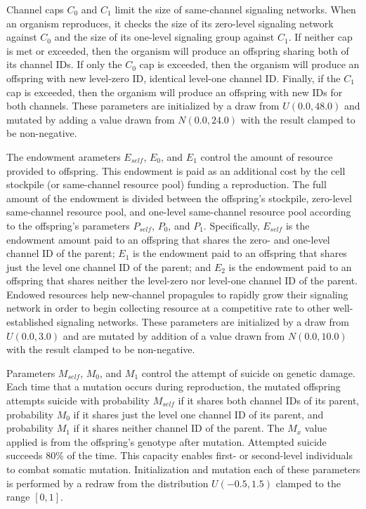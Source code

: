 Channel caps $C_0$ and $C_1$ limit the size of same-channel signaling networks.
When an organism reproduces, it checks the size of its zero-level signaling network against $C_0$ and the size of its one-level signaling group against $C_1$.
If neither cap is met or exceeded, then the organism will produce an offspring sharing both of its channel IDs.
If only the $C_0$ cap is exceeded, then the organism will produce an offspring with new level-zero ID, identical level-one channel ID.
Finally, if the $C_1$ cap is exceeded, then the organism will produce an offspring with new IDs for both channels.
These parameters are initialized by a draw from $U(0.0, 48.0)$ and mutated by adding a value drawn from $N(0.0,24.0)$ with the result clamped to be non-negative.

The endowment arameters $E_{self}$, $E_0$, and $E_1$ control the amount of resource provided to offspring.
This endowment is paid as an additional cost by the cell stockpile (or same-channel resource pool) funding a reproduction.
The full amount of the endowment is divided between the offspring's stockpile, zero-level same-channel resource pool, and one-level same-channel resource pool according to the offspring's parameters $P_{self}$, $P_0$, and $P_1$.
Specifically, $E_{self}$ is the endowment amount paid to an offspring that shares the zero- and one-level channel ID of the parent;
$E_1$ is the endowment paid to an offspring that shares just the level one channel ID of the parent;
and $E_2$ is the endowment paid to an offspring that shares neither the level-zero nor level-one channel ID of the parent.
Endowed resources help new-channel propagules to rapidly grow their signaling network in order to begin collecting resource at a competitive rate to other well-established signaling networks.
These parameters are initialized by a draw from $U(0.0, 3.0)$ and are mutated by addition of a value drawn from $N(0.0,10.0)$ with the result clamped to be non-negative.

Parameters $M_{self}$, $M_0$, and $M_1$ control the attempt of suicide on genetic damage.
Each time that a mutation occurs during reproduction, the mutated offspring attempts suicide with probability $M_{self}$ if it shares both channel IDs of its parent, probability $M_0$ if it shares just the level one channel ID of its parent, and probability $M_1$ if it shares neither channel ID of the parent.
The $M_x$ value applied is from the offspring's genotype after mutation.
Attempted suicide succeeds %
80\% of the time.
This capacity enables first- or second-level individuals to combat somatic mutation.
Initialization and mutation each of these parameters is performed by a redraw from the distribution $U(-0.5,1.5)$ clamped to the range $[0,1]$.

